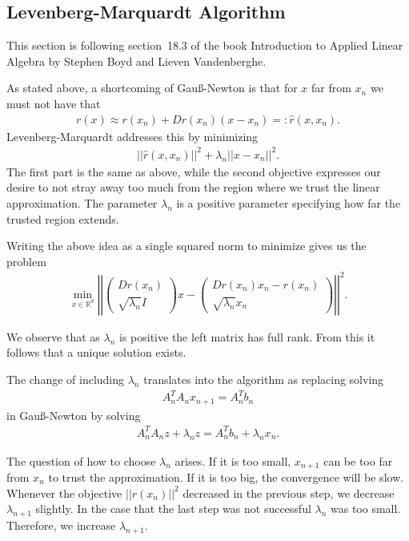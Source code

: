 \subsection{Levenberg-Marquardt Algorithm}

This section is following section~18.3 of the book Introduction to Applied Linear Algebra by Stephen Boyd and Lieven Vandenberghe\cite{Boyd2018}.

As stated above, a shortcoming of Gauß-Newton is that for $x$ far from $x_n$ we must not have that
\begin{align*}
	r(x) \approx r(x_n) + Dr(x_n)(x-x_n) =: \hat{r}(x, x_n).
\end{align*}
Levenberg-Marquardt addresses this by minimizing
\begin{align*}
	||\hat{r}(x, x_n)||^2 + \lambda_n ||x-x_n||^2.
\end{align*}
The first part is the same as above, while the second objective expresses our desire to not stray away too much from the region where we trust the linear approximation. The parameter $\lambda_n$ is a positive parameter specifying how far the trusted region extends.

Writing the above idea as a single squared norm to minimize gives us the problem
\begin{align*}
	\min_{x \in \mathds{R}^d}
	\left|\left|\left(\begin{matrix}
		Dr(x_n)\\ \sqrt{\lambda_n}I
	\end{matrix}\right) x - \left(\begin{matrix}
		Dr(x_n)x_n - r(x_n)\\ \sqrt{\lambda_n} x_n
	\end{matrix}\right)\right|\right|^2.
\end{align*}

We observe that as $\lambda_n$ is positive the left matrix has full rank. From this it follows that a unique solution exists.

The change of including $\lambda_n$ translates into the algorithm as replacing solving
\begin{align*}
	A_n^TA_nx_{n+1} = A_n^Tb_n
\end{align*}
in Gauß-Newton by solving
\begin{align*}
	A_n^T A_n z + \lambda_n z= A_n^T b_n + \lambda_n x_n.
\end{align*}

The question of how to choose $\lambda_n$ arises. If it is too small, $x_{n+1}$ can be too far from $x_n$ to trust the approximation. If it is too big, the convergence will be slow. Whenever the objective $||r(x_n)||^2$ decreased in the previous step, we decrease $\lambda_{n+1}$ slightly. In the case that the last step was not successful $\lambda_n$ was too small. Therefore, we increase $\lambda_{n+1}$.

